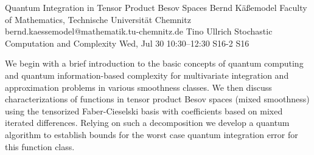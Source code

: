 \begin{talk}
  {Quantum Integration in Tensor Product  Besov Spaces}%
  {Bernd Käßemodel}%
  {Faculty of Mathematics, Technische Universität Chemnitz}%
  {bernd.kaessemodel@mathematik.tu-chemnitz.de}%
  {Tino Ullrich}%
  {Stochastic Computation and Complexity}%
  {Wed, Jul 30 10:30–12:30}%
  {S16-2}%
  {S16}%
				

We begin with a brief introduction to the basic concepts of quantum computing and quantum information-based complexity for multivariate integration and approximation problems in various smoothness classes. We then discuss characterizations of functions in tensor product Besov spaces (mixed smoothness) using the tensorized Faber-Cieselski basis with coefficients based on mixed iterated differences. Relying on such a decomposition we develop a quantum algorithm to establish bounds for the worst case quantum integration error for this function class. 

\medskip
%
%
\end{talk}

